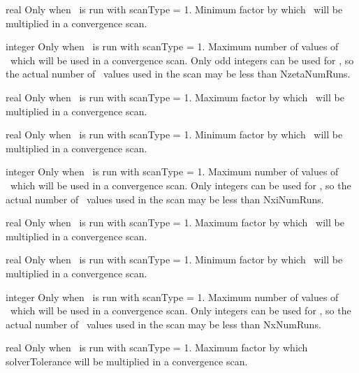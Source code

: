 \myhrule

{real}
{Only when \sfincsScan~is run with {\ttfamily scanType} = 1.}
{Minimum factor by which \Nzeta~will be multiplied in a convergence scan.}

\myhrule

{integer}
{Only when \sfincsScan~is run with {\ttfamily scanType} = 1.}
{Maximum number of values of \Nzeta~which will be used in a convergence scan.  Only odd integers can be used
for \Nzeta, so the actual number of \Nzeta~values used in the scan may be less than {\ttfamily NzetaNumRuns}.}

\myhrule

{real}
{Only when \sfincsScan~is run with {\ttfamily scanType} = 1.}
{Maximum factor by which \Nxi~will be multiplied in a convergence scan.}

\myhrule

{real}
{Only when \sfincsScan~is run with {\ttfamily scanType} = 1.}
{Minimum factor by which \Nxi~will be multiplied in a convergence scan.}

\myhrule

{integer}
{Only when \sfincsScan~is run with {\ttfamily scanType} = 1.}
{Maximum number of values of \Nxi~which will be used in a convergence scan.  Only integers can be used
for \Nxi, so the actual number of \Nxi~values used in the scan may be less than {\ttfamily NxiNumRuns}.}

\myhrule

{real}
{Only when \sfincsScan~is run with {\ttfamily scanType} = 1.}
{Maximum factor by which \Nx~will be multiplied in a convergence scan.}

\myhrule

{real}
{Only when \sfincsScan~is run with {\ttfamily scanType} = 1.}
{Minimum factor by which \Nx~will be multiplied in a convergence scan.}

\myhrule

{integer}
{Only when \sfincsScan~is run with {\ttfamily scanType} = 1.}
{Maximum number of values of \Nx~which will be used in a convergence scan.  Only integers can be used
for \Nx, so the actual number of \Nx~values used in the scan may be less than {\ttfamily NxNumRuns}.}

\myhrule

{real}
{Only when \sfincsScan~is run with {\ttfamily scanType} = 1.}
{Maximum factor by which {\ttfamily solverTolerance} will be multiplied in a convergence scan.}

